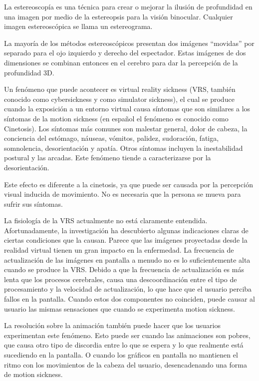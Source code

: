 \documentclass[12pt]{article}
\begin{document}
La estereoscopía es una técnica para crear o mejorar la ilusión de profundidad en una imagen por medio de la estereopsis para la visión binocular. Cualquier imagen estereoscópica se llama un estereograma. 

La mayoría de los métodos estereoscópicos presentan  dos imágenes “movidas” por separado para el ojo izquierdo y derecho del espectador. Estas imágenes de dos dimensiones se combinan entonces en el cerebro para dar la percepción de la profundidad 3D.

Un fenómeno que puede acontecer es virtual reality sickness (VRS, también conocido como cybersickness y como simulator sickness), el cual se produce cuando la exposición a un entorno virtual causa síntomas que son similares a los síntomas de la motion sickness\cite{VRS} (en español el fenómeno es conocido como Cinetosis). Los síntomas más comunes son malestar general, dolor de cabeza, la conciencia del estómago, náuseas, vómitos, palidez, sudoración, fatiga, somnolencia, desorientación y apatía. Otros síntomas incluyen la inestabilidad postural y las arcadas. Este fenómeno tiende a caracterizarse por la desorientación.

Este efecto es diferente a la cinetosis, ya que puede ser causada por la percepción visual inducida de movimiento. No es necesaria que la persona se mueva para sufrir sus síntomas.

La fisiología de la VRS actualmente no está claramente entendida. Afortunadamente, la investigación ha descubierto algunas indicaciones claras de ciertas condiciones que la causan. Parece que las imágenes proyectadas desde la realidad virtual tienen un gran impacto en la enfermedad. La frecuencia de actualización de las imágenes en pantalla a menudo no es lo suficientemente alta cuando se produce la VRS. Debido a que la frecuencia de actualización es más lenta que los procesos cerebrales, causa una descoordinación entre el tipo de procesamiento y la velocidad de actualización, lo que hace que el usuario perciba fallos en la pantalla. Cuando estos dos componentes no coinciden, puede causar al usuario las mismas sensaciones que cuando se experimenta motion sickness.

La resolución sobre la animación también puede hacer que los usuarios experimentan este fenómeno\cite{oculussickness}. Esto puede ser cuando las animaciones son pobres, que  causa otro tipo de discordia entre lo que se espera y lo que realmente está sucediendo en la pantalla. O cuando los gráficos en pantalla no mantienen el ritmo con los movimientos de la cabeza del usuario, desencadenando una forma de motion sickness.
\end{document}
